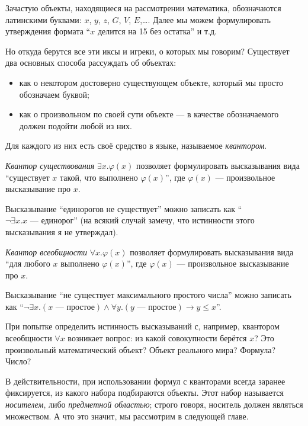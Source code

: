 Зачастую объекты, находящиеся на рассмотрении математика, обозначаются
латинскими буквами: $x$, $y$, $z$, $G$, $V$, $E$,\dots. Далее мы можем
формулировать утверждения формата ``$x$ делится на 15 без остатка'' и т.д.

Но откуда берутся все эти иксы и игреки, о которых мы говорим? Существует два
основных способа рассуждать об объектах:

\begin{itemize}
  \item как о некотором достоверно существующем объекте, который мы просто
    обозначаем буквой;
  \item как о произвольном по своей сути объекте --- в качестве обозначаемого
    должен подойти любой из них.
\end{itemize}

Для каждого из них есть своё средство в языке, называемое \textit{квантором}.

\textit{Квантор существования} $\exists x.\varphi(x)$ позволяет формулировать
высказывания вида ``существует $x$ такой, что выполнено $\varphi(x)$'', где
$\varphi(x)$ --- произвольное высказывание про $x$.

\begin{ex}
  Высказывание ``единорогов не существует'' можно записать как
  ``$\neg\exists x.x\textrm{ --- единорог}$'' (на всякий случай замечу, что
  истинности этого высказывания я не утверждал).
\end{ex}

\textit{Квантор всеобщности} $\forall x.\varphi(x)$ позволяет формулировать
высказывания вида ``для любого $x$ выполнено $\varphi(x)$'', где $\varphi(x)$
--- произвольное высказывание про $x$.

\begin{ex}
  Высказывание ``не существует максимального простого числа'' можно записать как
  ``$\neg\exists x.(x\textrm{ --- простое})\land
  \forall y.(y\textrm{ --- простое})\to y\leqslant x$''.
\end{ex}

При попытке определить истинность высказываний с, например, квантором
всеобщности $\forall x$ возникает вопрос: из какой совокупности берётся $x$? Это
произвольный математический объект? Объект реального мира? Формула? Число?

В действительности, при использовании формул с кванторами всегда заранее
фиксируется, из какого набора подбираются объекты. Этот набор называется
\textit{носителем}, либо \textit{предметной областью}; строго говоря, носитель
должен являться множеством. А что это значит, мы рассмотрим в следующей главе.
